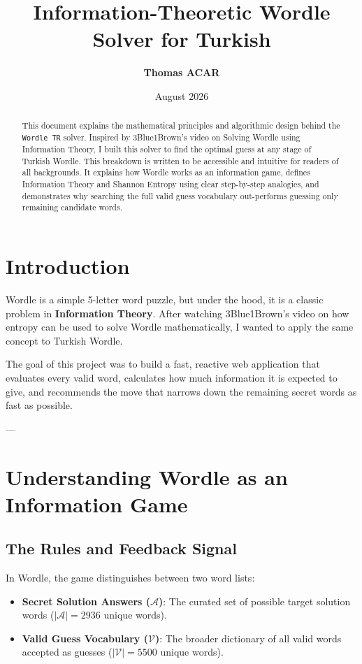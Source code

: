 \documentclass[11pt,a4paper]{article}
\title{\textbf{Information-Theoretic Wordle Solver for Turkish}}
\author{\textbf{Thomas ACAR}}
\date{August 2026}
\begin{document}
\maketitle

\begin{abstract}
This document explains the mathematical principles and algorithmic design behind the \texttt{Wordle TR} solver. Inspired by 3Blue1Brown's video on Solving Wordle using Information Theory, I built this solver to find the optimal guess at any stage of Turkish Wordle. This breakdown is written to be accessible and intuitive for readers of all backgrounds. It explains how Wordle works as an information game, defines Information Theory and Shannon Entropy using clear step-by-step analogies, and demonstrates why searching the full valid guess vocabulary out-performs guessing only remaining candidate words.
\end{abstract}

\section{Introduction}
Wordle is a simple 5-letter word puzzle, but under the hood, it is a classic problem in \textbf{Information Theory}. After watching 3Blue1Brown's video on how entropy can be used to solve Wordle mathematically, I wanted to apply the same concept to Turkish Wordle.

The goal of this project was to build a fast, reactive web application that evaluates every valid word, calculates how much information it is expected to give, and recommends the move that narrows down the remaining secret words as fast as possible.

---

\section{Understanding Wordle as an Information Game}

\subsection{The Rules and Feedback Signal}
In Wordle, the game distinguishes between two word lists:
\begin{itemize}[itemsep=2pt]
    \item \textbf{Secret Solution Answers ($\mathcal{A}$)}: The curated set of possible target solution words ($|\mathcal{A}| = 2936$ unique words).
    \item \textbf{Valid Guess Vocabulary ($\mathcal{V}$)}: The broader dictionary of all valid words accepted as guesses ($|\mathcal{V}| = 5500$ unique words).
\end{itemize}
\end{document}
